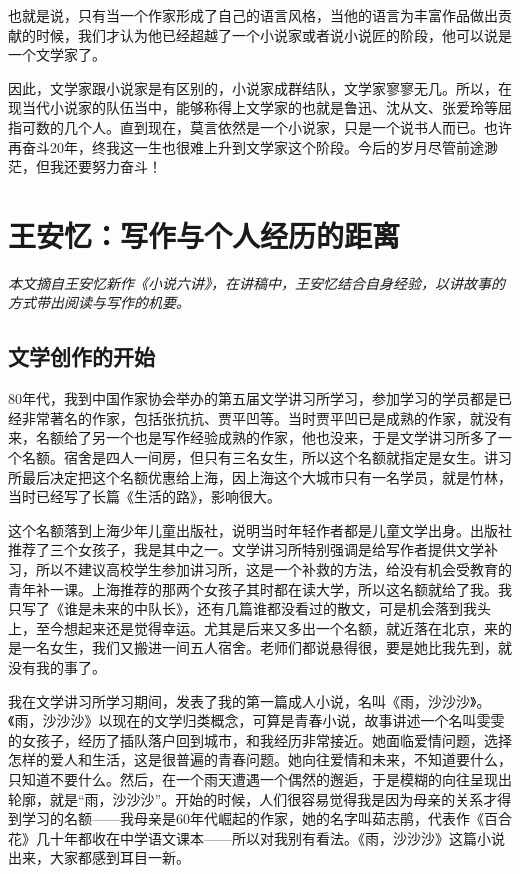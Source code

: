\documentclass[12pt,a5paper]{ctexbook}
\begin{document}
也就是说，只有当一个作家形成了自己的语言风格，当他的语言为丰富作品做出贡献的时候，我们才认为他已经超越了一个小说家或者说小说匠的阶段，他可以说是一个文学家了。

因此，文学家跟小说家是有区别的，小说家成群结队，文学家寥寥无几。所以，在现当代小说家的队伍当中，能够称得上文学家的也就是鲁迅、沈从文、张爱玲等屈指可数的几个人。直到现在，莫言依然是一个小说家，只是一个说书人而已。也许再奋斗20年，终我这一生也很难上升到文学家这个阶段。今后的岁月尽管前途渺茫，但我还要努力奋斗！

\newpage

\section{王安忆：写作与个人经历的距离}

\emph{本文摘自王安忆新作《小说六讲》，在讲稿中，王安忆结合自身经验，以讲故事的方式带出阅读与写作的机要。}
\vspace{2em}

\subsection{文学创作的开始}
80年代，我到中国作家协会举办的第五届文学讲习所学习，参加学习的学员都是已经非常著名的作家，包括张抗抗、贾平凹等。当时贾平凹已是成熟的作家，就没有来，名额给了另一个也是写作经验成熟的作家，他也没来，于是文学讲习所多了一个名额。宿舍是四人一间房，但只有三名女生，所以这个名额就指定是女生。讲习所最后决定把这个名额优惠给上海，因上海这个大城市只有一名学员，就是竹林，当时已经写了长篇《生活的路》，影响很大。

这个名额落到上海少年儿童出版社，说明当时年轻作者都是儿童文学出身。出版社推荐了三个女孩子，我是其中之一。文学讲习所特别强调是给写作者提供文学补习，所以不建议高校学生参加讲习所，这是一个补救的方法，给没有机会受教育的青年补一课。上海推荐的那两个女孩子其时都在读大学，所以这名额就给了我。我只写了《谁是未来的中队长》，还有几篇谁都没看过的散文，可是机会落到我头上，至今想起来还是觉得幸运。尤其是后来又多出一个名额，就近落在北京，来的是一名女生，我们又搬进一间五人宿舍。老师们都说悬得很，要是她比我先到，就没有我的事了。

我在文学讲习所学习期间，发表了我的第一篇成人小说，名叫《雨，沙沙沙》。《雨，沙沙沙》以现在的文学归类概念，可算是青春小说，故事讲述一个名叫雯雯的女孩子，经历了插队落户回到城市，和我经历非常接近。她面临爱情问题，选择怎样的爱人和生活，这是很普遍的青春问题。她向往爱情和未来，不知道要什么，只知道不要什么。然后，在一个雨天遭遇一个偶然的邂逅，于是模糊的向往呈现出轮廓，就是“雨，沙沙沙”。开始的时候，人们很容易觉得我是因为母亲的关系才得到学习的名额——我母亲是60年代崛起的作家，她的名字叫茹志鹃，代表作《百合花》几十年都收在中学语文课本——所以对我别有看法。《雨，沙沙沙》这篇小说出来，大家都感到耳目一新。
\end{document}
